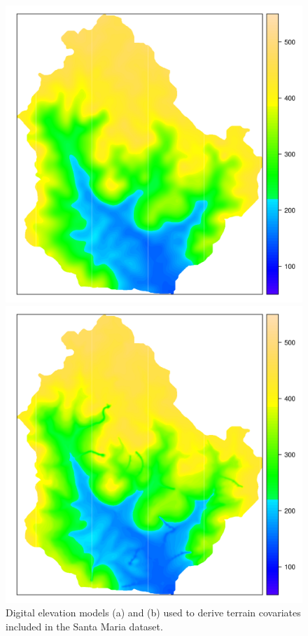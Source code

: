 \begin{figure}[!ht]
\centering
\begin{minipage}[b]{0.45\textwidth}
\subcaption{}
\centering
\includegraphics[width = \textwidth]{fig/chap05-dem-old}
\end{minipage}
\begin{minipage}[b]{0.45\textwidth}
\subcaption{}
\centering
\includegraphics[width = \textwidth]{fig/chap05-dem-new}
\end{minipage} 
\caption[Digital elevation models included in the Santa Maria dataset.]{Digital elevation models (a) \demOld{} 
and (b) \demNew{} used to derive terrain covariates included in the Santa Maria dataset.}
\label{fig:chap05-dem}
\end{figure}

